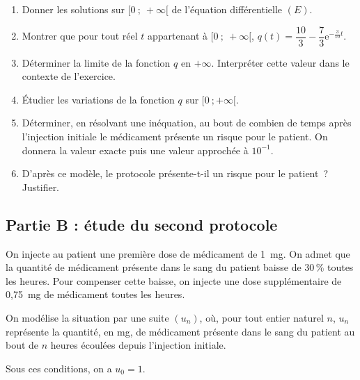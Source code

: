 \documentclass[10pt]{article}
\providecommand{\e}{{\mathrm{e}}}
\begin{document}
\begin{enumerate}
\item Donner les solutions sur $[0~;~+\infty[$ de l'équation différentielle $(E)$.
\item Montrer que pour tout réel $t$ appartenant à $[0~;~+\infty[$, $q(t) = \dfrac{10}{3} - \dfrac{7}{3}\e^{-\frac{3}{10}t}$.
\item Déterminer la limite de la fonction $q$ en $+\infty$. Interpréter cette valeur dans le contexte de l'exercice.
\item Étudier les variations de la fonction $q$ sur $[0~;+\infty[$.
\item Déterminer, en résolvant une inéquation, au bout de combien de temps après l'injection initiale le médicament présente un risque pour le patient. On donnera la valeur exacte puis une valeur approchée à $10^{-1}$.
\item D'après ce modèle, le protocole présente-t-il un risque pour le patient~? Justifier.
\end{enumerate}


\subsection*{Partie B : étude du second protocole}

On injecte au patient une première dose de médicament de 1~mg. On admet que la quantité de médicament présente dans le sang du patient baisse de 30\,\% toutes les heures. Pour compenser cette baisse, on injecte une dose supplémentaire de 0,75~mg de médicament toutes les heures.

On modélise la situation par une suite $(u_n)$, où, pour tout entier naturel $n$, $u_n$ représente la quantité, en mg, de médicament présente dans le sang du patient au bout de $n$ heures écoulées depuis l'injection initiale.

Sous ces conditions, on a $u_0 = 1$.
\end{document}
